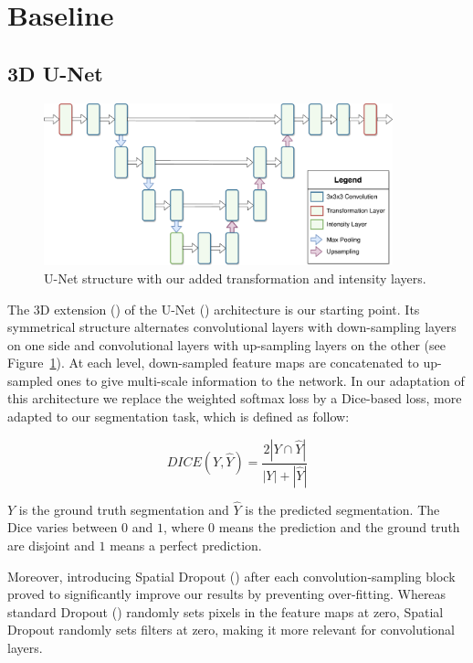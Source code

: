 \section{Baseline}
\label{sec:kidney_baseline}

\subsection{3D U-Net}
\label{ssec:unet}

\begin{figure}
	\includegraphics[width=0.9\textwidth]{img_transfer/UNet}
    \caption{U-Net structure with our added transformation and intensity layers.}
    \label{fig:unet}
\end{figure}

The 3D extension (\textcite{cicek2016MICCAI}) of the U-Net (\textcite{ronneberger2015MICCAI}) architecture is our starting point. Its symmetrical structure alternates convolutional layers with down-sampling layers on one side and convolutional layers with up-sampling layers on the other (see Figure~\ref{fig:unet}). At each level, down-sampled feature maps are concatenated to up-sampled ones to give multi-scale information to the network. In our adaptation of this architecture we replace the weighted softmax loss by a Dice-based loss, more adapted to our segmentation task, which is defined as follow:

\begin{equation}
    DICE \left( Y, \hat{Y} \right) = \frac{2 |Y \cap \hat{Y}|}{|Y| + |\hat{Y}|}
\end{equation}

$Y$ is the ground truth segmentation and $\hat{Y}$ is the predicted segmentation. The Dice varies between $0$ and $1$, where $0$ means the prediction and the ground truth are disjoint and $1$ means a perfect prediction.

Moreover, introducing Spatial Dropout (\textcite{tompson2015CVPR}) after each convolution-sampling block proved to significantly improve our results by preventing over-fitting. Whereas standard Dropout (\textcite{srivastava2014}) randomly sets pixels in the feature maps at zero, Spatial Dropout randomly sets filters at zero, making it more relevant for convolutional layers.

